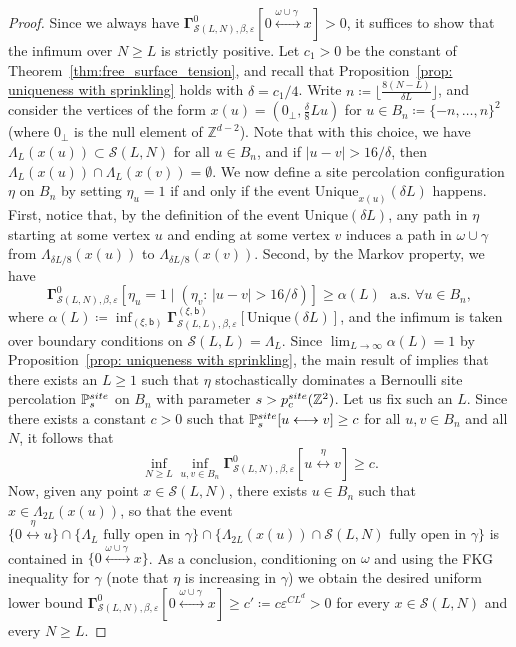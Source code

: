 \documentclass[11pt,a4paper]{article}
\theoremstyle{definition}
\numberwithin{equation}{section}
\newcommand\Z{\mathbb{Z}}
\begin{document}
\begin{proof}
Since we always have $\boldsymbol{\Gamma}^0_{\mathcal{S}(L,N),\beta,\varepsilon} [0\overset{\omega\cup \gamma\:}{\longleftrightarrow} x]>0$, it suffices to show that the infimum over $N\geq L$ is strictly positive.
Let $c_1>0$ be the constant of Theorem~\ref{thm:free_surface_tension}, and recall that Proposition~\ref{prop: uniqueness with sprinkling} holds with $\delta=c_1/4$. Write $n\coloneqq \lfloor \frac{8(N-L)}{\delta L}\rfloor$, and consider the vertices of the form $x(u)=\left(0_\bot,\frac{\delta}{8}Lu\right)$ for $u\in B_n\coloneqq \{-n,\ldots,n\}^2$ (where $0_\bot$ is the null element of $\mathbb Z^{d-2}$). Note that with this choice, we have $\Lambda_L(x(u))\subset \mathcal{S}(L,N)$ for all $u\in B_n$, and if $|u-v|> 16/\delta$, then $\Lambda_L(x(u))\cap \Lambda_L(x(v))=\emptyset$. We now define a site percolation configuration $\eta$ on $B_n$ by setting $\eta_u=1$ if and only if the event $\mathrm{Unique}_{x(u)}(\delta L)$ happens. First, notice that, by the definition of the event $\mathrm{Unique}(\delta L)$, any path in $\eta$ starting at some vertex $u$ and ending at some vertex $v$ induces a path in $\omega\cup\gamma$ from $\Lambda_{\delta L/8}(x(u))$ to $\Lambda_{\delta L/8}(x(v))$. Second, by the Markov property, we have
\begin{equation}
\boldsymbol{\Gamma}^0_{\mathcal{S}(L,N),\beta,\varepsilon}[\eta_u=1 \mid (\eta_v:\, |u-v|> 16/\delta)] \geq \alpha(L) ~~~\text{a.s. } \forall u\in B_n,
\end{equation}
where $\alpha(L)\coloneqq \inf_{(\xi,\mathsf{b})} \boldsymbol{\Gamma}^{(\xi,\mathsf{b})}_{\mathcal{S}(L,L),\beta,\varepsilon}[\mathrm{Unique}(\delta L)]$, and the infimum is taken over boundary conditions on $\mathcal{S}(L,L)=\Lambda_L$. Since $\lim_{L\to\infty} \alpha(L)= 1$ by Proposition~\ref{prop: uniqueness with sprinkling}, the main result of \cite{LSS97} implies that there exists an $L\geq 1$ such that $\eta$ stochastically dominates a Bernoulli site percolation $\mathbb{P}_s^{\textup{site}}$ on $B_n$ with parameter $s>p_c^{\textup{site}}(\Z^2)$. Let us fix such an $L$. Since there exists a constant $c>0$ such that $\mathbb{P}_s^{\textup{site}}[u\longleftrightarrow v]\geq c$ for all $u,v\in B_n$ and all $N$, it follows that 
\begin{equation}
\inf_{N\geq L}\inf_{u,v\in B_n}\boldsymbol{\Gamma}^0_{\mathcal{S}(L,N),\beta,\varepsilon}[u \overset{\eta}{\longleftrightarrow} v]\geq c.
\end{equation}
Now, given any point $x\in\mathcal{S}(L,N)$, there exists $u\in B_n$ such that $x\in \Lambda_{2L}(x(u))$, so that the event $\{0 \overset{\eta}{\longleftrightarrow} u\}\cap \{\Lambda_L \text{ fully open in } \gamma\} \cap \{\Lambda_{2L}(x(u))\cap\mathcal{S}(L,N) \text{ fully open in } \gamma\}$ is contained in $\{0 \overset{\omega\cup\gamma\:}{\longleftrightarrow} x\}$. As a conclusion, conditioning on $\omega$ and using the FKG inequality for $\gamma$ (note that $\eta$ is increasing in $\gamma$) we obtain the desired uniform lower bound $\boldsymbol{\Gamma}^0_{\mathcal{S}(L,N),\beta,\varepsilon}[0 \overset{\omega\cup\gamma\:}{\longleftrightarrow} x]\geq c'\coloneqq c \varepsilon^{CL^d}>0$ for every $x\in \mathcal{S}(L,N)$ and every $N\geq L$.

\end{proof}
\end{document}
